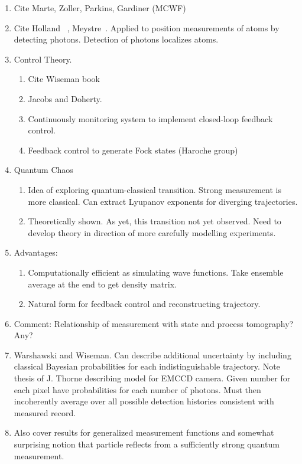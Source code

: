 \begin{enumerate}
\item Cite Marte, Zoller, Parkins, Gardiner (MCWF)  \cite{Dalibard1992,Dum1992,Gardiner1992}
\item Cite Holland ~\cite{Holland1996}, Meystre~\cite{Greenwood1997}.
  Applied to position measurements of atoms by detecting photons.
  Detection of photons localizes atoms.  
\item Control Theory.~\cite{Wiseman1993} 
\begin{enumerate}
    \item Cite Wiseman book
   \item Jacobs and Doherty.
  \item Continuously monitoring system to implement closed-loop feedback control.  
  \item Feedback control to generate Fock states (Haroche group)
\end{enumerate}
\item Quantum Chaos
\begin{enumerate}
  \item Idea of exploring quantum-classical transition.
  Strong measurement is more classical.
  Can extract Lyupanov exponents for diverging trajectories.
  \cite{Bhattacharya2000,Habib2002,Habib2006}
  \cite{Scott2001}
  \item Theoretically shown.  As yet, this transition  not yet observed.  Need to develop
    theory in direction of more carefully modelling experiments.  
\end{enumerate}
\item Advantages:
\begin{enumerate}
  \item Computationally efficient as simulating wave functions.
  Take ensemble average at the end to get density matrix.  
  \item Natural form for feedback control and reconstructing trajectory.  
\end{enumerate}
\item Comment: Relationship of measurement with state and process tomography?  Any?  

\item Warshawski and Wiseman.
  Can describe additional uncertainty by including classical Bayesian probabilities for each indistinguishable trajectory.
  Note thesis of J. Thorne describing model for EMCCD camera.
  Given number for each pixel have probabilities for each number of photons.
  Must then incoherently average over all possible detection histories consistent with measured record.
  \cite{Warszawski2002,Warszawski2003a,Warszawski2003b}
\item Also cover results for generalized measurement functions and 
    somewhat surprising notion that particle reflects from a sufficiently
    strong quantum measurement.~\cite{Mackrory2010}
\end{enumerate}


